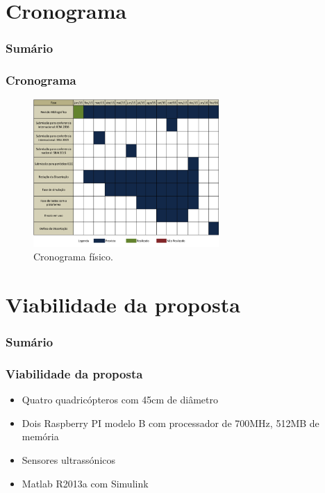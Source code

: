 \documentclass{beamer}
\begin{document}
\section{Cronograma}

\begin{frame}
	\frametitle{Sumário}
	\tableofcontents[currentsection]
\end{frame}

\begin{frame}
	
	\frametitle{Cronograma}
	
	\begin{figure}[h]
		\centering
		\includegraphics[keepaspectratio = true,
		width=0.63\textwidth]{img/cronograma.png}
		\caption{Cronograma físico.}
		\label{fig:cronograma}
	\end{figure}
	
\end{frame}	

\section{Viabilidade da proposta}

\begin{frame}
	\frametitle{Sumário}
	\tableofcontents[currentsection]
\end{frame}

\begin{frame}
	
	\frametitle{Viabilidade da proposta}
	
	\begin{itemize}	
		
		\item  Quatro quadricópteros com 45cm de diâmetro
		
		\item Dois Raspberry PI modelo B com processador de 700MHz, 512MB de memória
		
		\item Sensores ultrassónicos
		
		\item Matlab R2013a com Simulink
		
	\end{itemize}	
	
	
\end{frame}	
\end{document}
